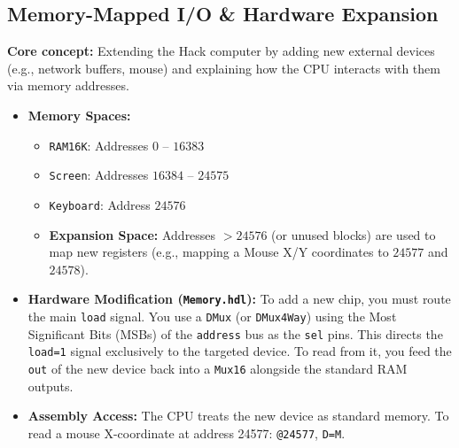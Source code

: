 \documentclass[12pt,a4paper]{article}
\begin{document}
\subsection{Memory-Mapped I/O \& Hardware Expansion}
\textbf{Core concept:} Extending the Hack computer by adding new external devices (e.g., network buffers, mouse) and explaining how the CPU interacts with them via memory addresses.
\begin{itemize}
    \item \textbf{Memory Spaces:} 
    \begin{itemize}
        \item \texttt{RAM16K}: Addresses $0$ -- $16383$
        \item \texttt{Screen}: Addresses $16384$ -- $24575$
        \item \texttt{Keyboard}: Address $24576$
        \item \textbf{Expansion Space:} Addresses $> 24576$ (or unused blocks) are used to map new registers (e.g., mapping a Mouse X/Y coordinates to $24577$ and $24578$).
    \end{itemize}
    \item \textbf{Hardware Modification (\texttt{Memory.hdl}):} To add a new chip, you must route the main \texttt{load} signal. You use a \texttt{DMux} (or \texttt{DMux4Way}) using the Most Significant Bits (MSBs) of the \texttt{address} bus as the \texttt{sel} pins. This directs the \texttt{load=1} signal exclusively to the targeted device. To read from it, you feed the \texttt{out} of the new device back into a \texttt{Mux16} alongside the standard RAM outputs.
    \item \textbf{Assembly Access:} The CPU treats the new device as standard memory. To read a mouse X-coordinate at address 24577: \texttt{@24577}, \texttt{D=M}.
\end{itemize}
\end{document}

